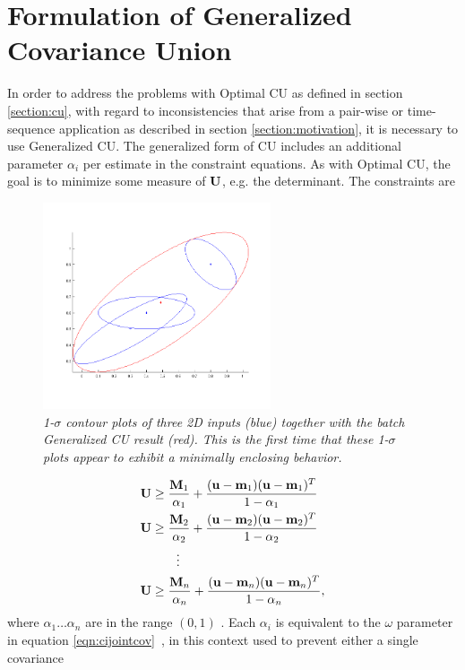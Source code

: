\section{Formulation of Generalized Covariance Union}\label{section:gcu}
In order to address the problems with Optimal CU as defined in section \ref{section:cu}, with regard to inconsistencies
that arise from a pair-wise or time-sequence application as described in section \ref{section:motivation}, it is
necessary to use Generalized CU. The generalized form of CU includes an additional parameter $\alpha_i$ per estimate in
the constraint equations. As with Optimal CU, the goal is to minimize some measure of $\mathbf{U}$, e.g. the determinant. The
constraints are
\begin{figure}[tbp]
    \centering\includegraphics[width=0.6\textwidth]{figures/cu2d-gen-batch.png}
    \caption{\it 1-$\sigma$ contour plots of three 2D inputs (blue) together with the batch Generalized CU result (red).
        This is the first time that these 1-$\sigma$ plots appear to exhibit a minimally enclosing behavior.}
    \label{fig:cu2d-gen-batch}
\end{figure}
\begin{align}
    \mathbf{U}   &\geq    \frac{\mathbf{M}_1}{\alpha_1} + \frac{(\mathbf{u}-\mathbf{m}_1)(\mathbf{u}-\mathbf{m}_1)^T}{1-\alpha_1}\nonumber\\
    \mathbf{U}   &\geq    \frac{\mathbf{M}_2}{\alpha_2} + \frac{(\mathbf{u}-\mathbf{m}_2)(\mathbf{u}-\mathbf{m}_2)^T}{1-\alpha_2}\nonumber\\
    ~       &\qquad\vdots\nonumber\\
    \mathbf{U}   &\geq    \frac{\mathbf{M}_n}{\alpha_n} + \frac{(\mathbf{u}-\mathbf{m}_n)(\mathbf{u}-\mathbf{m}_n)^T}{1-\alpha_n},\label{eqn:gcu}
\end{align}
where $\alpha_1\dots\alpha_n$ are in the range $(0,1)$ \cite{fusion06}. Each $\alpha_i$ is equivalent to the $\omega$
parameter in equation \ref{eqn:cijointcov}~\cite{uhlmann03}, in this context used to prevent either a single covariance
